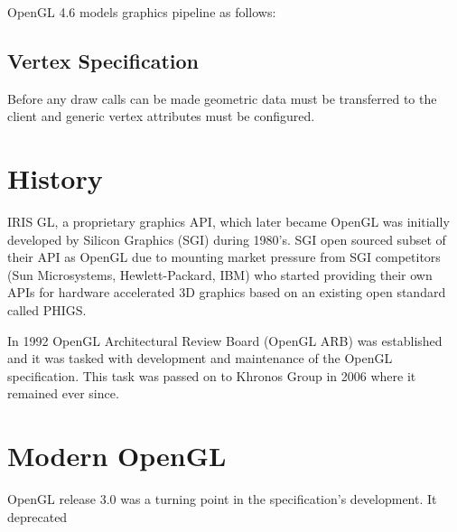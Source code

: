 OpenGL 4.6 models graphics pipeline as follows:

\subsection{Vertex Specification}

Before any draw calls can be made geometric data must be transferred to the client and generic vertex attributes must be configured.

\section{History}

IRIS GL, a proprietary graphics API, which later became OpenGL was initially developed by Silicon Graphics (SGI) during 1980's. SGI open sourced subset of their API as OpenGL due to mounting market pressure from SGI competitors (Sun Microsystems, Hewlett-Packard, IBM) who started providing their own APIs for hardware accelerated 3D graphics based on an existing open standard called PHIGS.

In 1992 OpenGL Architectural Review Board (OpenGL ARB) was established and it was tasked with development and maintenance of the OpenGL specification. This task was passed on to Khronos Group in 2006 where it remained ever since.

\section{Modern OpenGL}

OpenGL release 3.0 was a turning point in the specification's development. It deprecated  